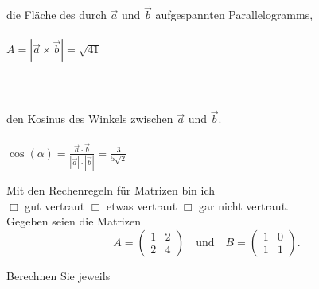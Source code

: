 \documentclass[12pt,answers]{exam}
\begin{document}
\begin{questions}
\begin{parts}
\begin{solution}
\begin{subparts}
\subpart die Fl\"ache des durch $\vec{a}$ und $\vec{b}$ aufgespannten Parallelogramms,
\\ \\
$A=|\vec{a}\times\vec{b}|=\sqrt{41}$
~~\\~~\\~~\\~~\\
\subpart den Kosinus des Winkels zwischen $\vec{a}$ und $\vec{b}$.
\\ \\
$\cos(\alpha)=\frac{\vec{a}\cdot\vec{b}}{|\vec{a}|\cdot|\vec{b}|}
=\frac{3}{5\sqrt{2}}$

\end{subparts}
\end{solution}
\end{parts}
\newpage

Mit den Rechenregeln für Matrizen bin ich \\ $\Box$ gut vertraut \hfill $\Box$ etwas vertraut \hfill $\Box$ gar nicht vertraut. \\[2ex]
Gegeben seien die Matrizen
\[
A=\left(\begin{array}{rr}1&2\\2&4\end{array}\right)
\textrm{~~~und~~~}
B=\left(\begin{array}{rr}1&0\\1&1\end{array}\right).
\]

Berechnen Sie jeweils\\
\begin{solution}
\end{solution}
\end{questions}
\end{document}
